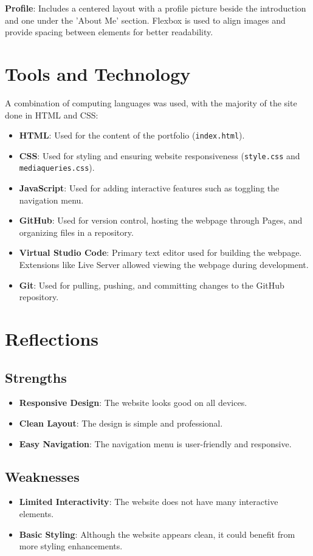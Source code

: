 \documentclass{article}
\begin{document}
\textbf{Profile}: Includes a centered layout with a profile picture beside the introduction and one under the 'About Me' section. Flexbox is used to align images and provide spacing between elements for better readability.

\section*{Tools and Technology}
A combination of computing languages was used, with the majority of the site done in HTML and CSS:
\begin{itemize}
    \item \textbf{HTML}: Used for the content of the portfolio (\texttt{index.html}).
    \item \textbf{CSS}: Used for styling and ensuring website responsiveness (\texttt{style.css} and \texttt{mediaqueries.css}).
    \item \textbf{JavaScript}: Used for adding interactive features such as toggling the navigation menu.
    \item \textbf{GitHub}: Used for version control, hosting the webpage through Pages, and organizing files in a repository.
    \item \textbf{Virtual Studio Code}: Primary text editor used for building the webpage. Extensions like Live Server allowed viewing the webpage during development.
    \item \textbf{Git}: Used for pulling, pushing, and committing changes to the GitHub repository.
\end{itemize}

\section*{Reflections}
\subsection*{Strengths}
\begin{itemize}
    \item \textbf{Responsive Design}: The website looks good on all devices.
    \item \textbf{Clean Layout}: The design is simple and professional.
    \item \textbf{Easy Navigation}: The navigation menu is user-friendly and responsive.
\end{itemize}

\subsection*{Weaknesses}
\begin{itemize}
    \item \textbf{Limited Interactivity}: The website does not have many interactive elements.
    \item \textbf{Basic Styling}: Although the website appears clean, it could benefit from more styling enhancements.
\end{itemize}
\end{document}
